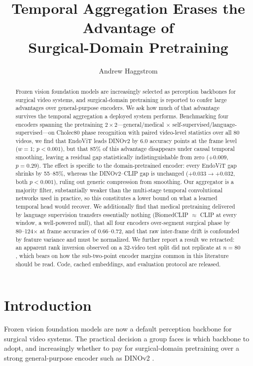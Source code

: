 \documentclass[10pt,twocolumn]{article}
\title{\bf Temporal Aggregation Erases the Advantage of\\
Surgical-Domain Pretraining}
\author{Andrew Haggstrom}
\date{}
\begin{document}
\maketitle

\begin{abstract}
Frozen vision foundation models are increasingly selected as perception
backbones for surgical video systems, and surgical-domain pretraining is
reported to confer large advantages over general-purpose encoders. We ask how
much of that advantage survives the temporal aggregation a deployed system
performs. Benchmarking four encoders spanning the pretraining
$2\times2$---general/medical $\times$ self-supervised/language-supervised---on
Cholec80 phase recognition with paired video-level statistics over all 80
videos, we find that EndoViT leads DINOv2 by 6.0 accuracy points at the frame level
($w{=}1$; $p<0.001$), but that 85\% of this advantage disappears under causal
temporal smoothing, leaving a residual gap
statistically indistinguishable from zero ($+0.009$, $p=0.29$). The effect is
specific to the domain-pretrained encoder: every EndoViT gap shrinks by
55--85\%, whereas the DINOv2--CLIP gap is unchanged ($+0.033 \to +0.032$, both
$p<0.001$), ruling out generic compression from smoothing. Our aggregator is a
majority filter, substantially weaker than the multi-stage temporal
convolutional networks used in practice, so this constitutes a lower bound on
what a learned temporal head would recover. We additionally find that medical
pretraining delivered by language supervision transfers essentially nothing
(BiomedCLIP $\approx$ CLIP at every window, a well-powered null), that all four
encoders over-segment surgical phase by 80--124$\times$ at frame accuracies of
0.66--0.72, and that raw inter-frame drift is confounded by feature variance
and must be normalized. We further report a result we retracted: an apparent
rank inversion observed on a 32-video test split did not replicate at $n=80$,
which bears on how the sub-two-point encoder margins common in this literature
should be read. Code, cached embeddings, and evaluation protocol are released.
\end{abstract}

\section{Introduction}

Frozen vision foundation models are now a default perception backbone for
surgical video systems. The practical decision a group faces is which backbone
to adopt, and increasingly whether to pay for surgical-domain pretraining
\citep{batic2024endovit,jaspers2025surgenetxl,zen2026} over a strong
general-purpose encoder such as DINOv2 \citep{oquab2024dinov2}.
\end{document}
